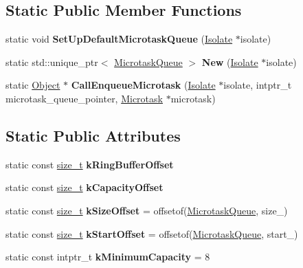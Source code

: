 \subsection*{Static Public Member Functions}
\begin{DoxyCompactItemize}
\item 
\mbox{\label{classv8_1_1internal_1_1MicrotaskQueue_a739c1ad542abf496dce792ceb0ecb3d6}} 
static void {\bfseries Set\+Up\+Default\+Microtask\+Queue} (\mbox{\hyperlink{classv8_1_1internal_1_1Isolate}{Isolate}} $\ast$isolate)
\item 
\mbox{\label{classv8_1_1internal_1_1MicrotaskQueue_afa424a9370b3aadfd466a8709a394abc}} 
static std\+::unique\+\_\+ptr$<$ \mbox{\hyperlink{classv8_1_1internal_1_1MicrotaskQueue}{Microtask\+Queue}} $>$ {\bfseries New} (\mbox{\hyperlink{classv8_1_1internal_1_1Isolate}{Isolate}} $\ast$isolate)
\item 
\mbox{\label{classv8_1_1internal_1_1MicrotaskQueue_a64dea5dabf395ad8510769e93827c53a}} 
static \mbox{\hyperlink{classv8_1_1internal_1_1Object}{Object}} $\ast$ {\bfseries Call\+Enqueue\+Microtask} (\mbox{\hyperlink{classv8_1_1internal_1_1Isolate}{Isolate}} $\ast$isolate, intptr\+\_\+t microtask\+\_\+queue\+\_\+pointer, \mbox{\hyperlink{classv8_1_1internal_1_1Microtask}{Microtask}} $\ast$microtask)
\end{DoxyCompactItemize}
\subsection*{Static Public Attributes}
\begin{DoxyCompactItemize}
\item 
static const \mbox{\hyperlink{classsize__t}{size\+\_\+t}} {\bfseries k\+Ring\+Buffer\+Offset}
\item 
static const \mbox{\hyperlink{classsize__t}{size\+\_\+t}} {\bfseries k\+Capacity\+Offset}
\item 
\mbox{\label{classv8_1_1internal_1_1MicrotaskQueue_a63f461f64c753251175926ec789e64c0}} 
static const \mbox{\hyperlink{classsize__t}{size\+\_\+t}} {\bfseries k\+Size\+Offset} = offsetof(\mbox{\hyperlink{classv8_1_1internal_1_1MicrotaskQueue}{Microtask\+Queue}}, size\+\_\+)
\item 
\mbox{\label{classv8_1_1internal_1_1MicrotaskQueue_af2873ba916dfe4147898ff7d37e07683}} 
static const \mbox{\hyperlink{classsize__t}{size\+\_\+t}} {\bfseries k\+Start\+Offset} = offsetof(\mbox{\hyperlink{classv8_1_1internal_1_1MicrotaskQueue}{Microtask\+Queue}}, start\+\_\+)
\item 
\mbox{\label{classv8_1_1internal_1_1MicrotaskQueue_a6634cbbe7acba35bc64f4864a416231c}} 
static const intptr\+\_\+t {\bfseries k\+Minimum\+Capacity} = 8
\end{DoxyCompactItemize}


